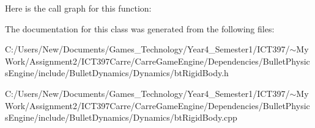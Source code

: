 Here is the call graph for this function:

The documentation for this class was generated from the following files:\begin{CompactItemize}
\item 
C:/Users/New/Documents/Games\_\-Technology/Year4\_\-Semester1/ICT397/$\sim$My Work/Assignment2/ICT397Carre/CarreGameEngine/Dependencies/BulletPhysicsEngine/include/BulletDynamics/Dynamics/btRigidBody.h\item 
C:/Users/New/Documents/Games\_\-Technology/Year4\_\-Semester1/ICT397/$\sim$My Work/Assignment2/ICT397Carre/CarreGameEngine/Dependencies/BulletPhysicsEngine/include/BulletDynamics/Dynamics/btRigidBody.cpp\end{CompactItemize}
